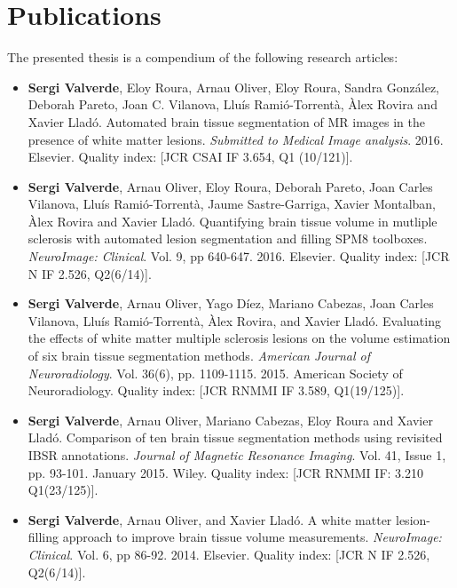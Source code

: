 
\chapter*{Publications}


The presented thesis is a compendium of the following research articles:

\begin{itemize}

\item  \textbf{Sergi Valverde}, Eloy Roura, Arnau Oliver, Eloy Roura, Sandra Gonz\'{a}lez, Deborah Pareto, Joan C. Vilanova, Llu\'{i}s Rami\'{o}-Torrent\`{a}, \`{A}lex Rovira and Xavier Llad\'{o}.  Automated brain tissue segmentation of MR images in the presence of white matter lesions. \textit{Submitted to Medical Image analysis}. 2016. Elsevier.  Quality index:  [JCR CSAI IF 3.654, Q1 (10/121)].

\item \textbf{Sergi Valverde}, Arnau Oliver, Eloy Roura, Deborah Pareto, Joan Carles Vilanova, Llu\'{i}s Rami\'{o}-Torrent\`{a}, Jaume Sastre-Garriga, Xavier Montalban, \`{A}lex Rovira and Xavier Llad\'{o}. Quantifying brain tissue volume in mutliple sclerosis with automated lesion segmentation and filling SPM8 toolboxes. \textit{NeuroImage: Clinical}. Vol. 9, pp 640-647. 2016. Elsevier.  Quality index:  [JCR N IF 2.526, Q2(6/14)].

\item  \textbf{Sergi Valverde}, Arnau Oliver, Yago D\'{i}ez, Mariano Cabezas, Joan Carles Vilanova, Llu\'{i}s Rami\'{o}-Torrent\`{a}, \`{A}lex Rovira, and Xavier Llad\'o. Evaluating the effects of white matter multiple sclerosis lesions on the volume estimation of six brain tissue segmentation methods. \textit{American Journal of Neuroradiology}. Vol. 36(6), pp. 1109-1115. 2015. American Society of Neuroradiology.  Quality index: [JCR RNMMI IF 3.589, Q1(19/125)].

\item \textbf{Sergi Valverde}, Arnau Oliver, Mariano Cabezas, Eloy Roura and Xavier Llad\'{o}. Comparison of ten brain tissue segmentation methods using revisited IBSR annotations. \textit{Journal of Magnetic Resonance Imaging}. Vol. 41, Issue 1, pp. 93-101. January 2015. Wiley.  Quality index: [JCR RNMMI IF: 3.210 Q1(23/125)].

\item  \textbf{Sergi Valverde}, Arnau Oliver, and Xavier Llad\'o. A white matter lesion-filling approach to improve brain tissue volume measurements. \textit{NeuroImage: Clinical}. Vol. 6, pp 86-92. 2014. Elsevier. Quality index: [JCR N IF 2.526, Q2(6/14)].


\end{itemize}



